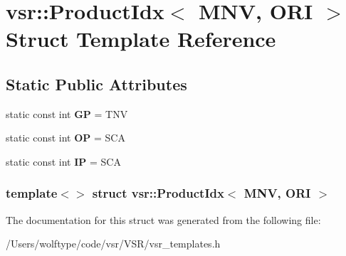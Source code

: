 \hypertarget{structvsr_1_1_product_idx_3_01_m_n_v_00_01_o_r_i_01_4}{\section{vsr\-:\-:Product\-Idx$<$ M\-N\-V, O\-R\-I $>$ Struct Template Reference}
\label{structvsr_1_1_product_idx_3_01_m_n_v_00_01_o_r_i_01_4}
}
\subsection*{Static Public Attributes}
\begin{DoxyCompactItemize}
\item 
\hypertarget{structvsr_1_1_product_idx_3_01_m_n_v_00_01_o_r_i_01_4_ae363164b98026d68cffd83a69623ce42}{static const int {\bfseries G\-P} = T\-N\-V}\label{structvsr_1_1_product_idx_3_01_m_n_v_00_01_o_r_i_01_4_ae363164b98026d68cffd83a69623ce42}

\item 
\hypertarget{structvsr_1_1_product_idx_3_01_m_n_v_00_01_o_r_i_01_4_a50a1409a27d9ecf1df363fab9fe56450}{static const int {\bfseries O\-P} = S\-C\-A}\label{structvsr_1_1_product_idx_3_01_m_n_v_00_01_o_r_i_01_4_a50a1409a27d9ecf1df363fab9fe56450}

\item 
\hypertarget{structvsr_1_1_product_idx_3_01_m_n_v_00_01_o_r_i_01_4_a9549f4b4cd46b3d68f64edc60d271007}{static const int {\bfseries I\-P} = S\-C\-A}\label{structvsr_1_1_product_idx_3_01_m_n_v_00_01_o_r_i_01_4_a9549f4b4cd46b3d68f64edc60d271007}

\end{DoxyCompactItemize}
\subsubsection*{template$<$$>$ struct vsr\-::\-Product\-Idx$<$ M\-N\-V, O\-R\-I $>$}



The documentation for this struct was generated from the following file\-:\begin{DoxyCompactItemize}
\item 
/\-Users/wolftype/code/vsr/\-V\-S\-R/vsr\-\_\-templates.\-h\end{DoxyCompactItemize}
